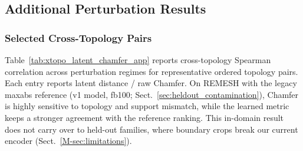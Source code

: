 \begin{table}[!htbp]
\centering
\scriptsize
\caption{
Latent distance clean same-topology and cross-topology Spearman correlation with
95\% subject-level bootstrap confidence intervals. Rows indicate source topology
and columns indicate target topology.
}
\label{tab:xtopo_latent_ci_app}
\setlength{\tabcolsep}{2.0pt}
\renewcommand{\arraystretch}{1.08}
\end{table}

\subsection{Additional Perturbation Results}

\label{app:perturbations}


\subsubsection{Selected Cross-Topology Pairs}
\label{app:selected_topology_pairs}

Table~\ref{tab:xtopo_latent_chamfer_app} reports cross-topology Spearman
correlation across perturbation regimes for representative ordered topology
pairs. Each entry reports latent distance / raw Chamfer. On REMESH with the legacy
maxabs reference (v1 model, fb100; Sect.~\ref{sec:heldout_contamination}), Chamfer
is highly sensitive to topology and support mismatch, while the learned metric
keeps a stronger agreement with the reference ranking. This in-domain result does
not carry over to held-out families, where boundary crops break our current
encoder (Sect.~\ref{M-sec:limitations}).

